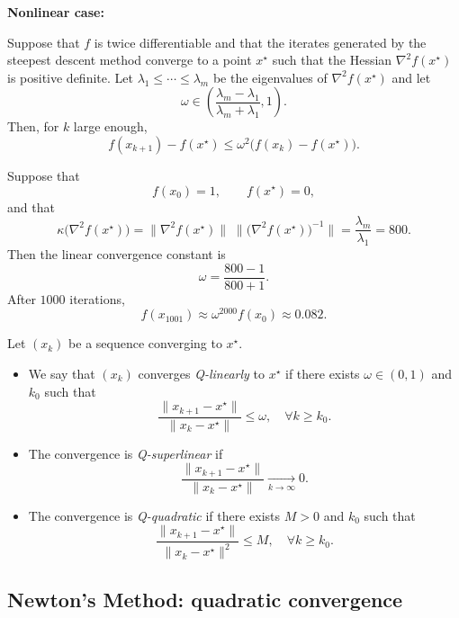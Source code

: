 \textbf{Nonlinear case:}
\begin{theoreme}
\label{thm:SD-nonlinear-rate}
Suppose that $f$ is twice differentiable and that the iterates generated by the
steepest descent method converge to a point $x^\star$ such that the Hessian
$\nabla^2 f(x^\star)$ is positive definite. Let
$\lambda_1 \le \cdots \le \lambda_m$ be the eigenvalues of $\nabla^2 f(x^\star)$
and let
\[
    \omega \in \left(\frac{\lambda_m - \lambda_1}{\lambda_m + \lambda_1}, 1\right).
\]
Then, for $k$ large enough,
\[
    f(x_{k+1}) - f(x^\star)
    \le \omega^2 \bigl( f(x_k) - f(x^\star) \bigr).
\]
\end{theoreme}

\begin{exemple}
Suppose that
\[
    f(x_0) = 1, \qquad f(x^\star) = 0,
\]
and that
\[
    \kappa\bigl(\nabla^2 f(x^\star)\bigr)
    = \|\nabla^2 f(x^\star)\|\;\bigl\|\bigl(\nabla^2 f(x^\star)\bigr)^{-1}\bigr\|
    = \frac{\lambda_m}{\lambda_1} = 800.
\]
Then the linear convergence constant is
\[
    \omega = \frac{800 - 1}{800 + 1}.
\]
After $1000$ iterations,
\[
    f(x_{1001}) \approx \omega^{2000} f(x_0) \approx 0.082.
\]
\end{exemple}

\begin{definition}
\label{def:convergence-rates}
Let $(x_k)$ be a sequence converging to $x^\star$.
\begin{itemize}
    \item We say that $(x_k)$ converges \emph{Q-linearly} to $x^\star$ if there exists
    $\omega \in (0,1)$ and $k_0$ such that
    \[
        \frac{\|x_{k+1} - x^\star\|}{\|x_k - x^\star\|}
        \le \omega, \quad \forall k \ge k_0.
    \]
    \item The convergence is \emph{Q-superlinear} if
    \[
        \frac{\|x_{k+1} - x^\star\|}{\|x_k - x^\star\|}
        \xrightarrow[k\to\infty]{} 0.
    \]
    \item The convergence is \emph{Q-quadratic} if there exists $M>0$ and $k_0$ such that
    \[
        \frac{\|x_{k+1} - x^\star\|}{\|x_k - x^\star\|^2}
        \le M,\quad \forall k \ge k_0.
    \]
\end{itemize}
\end{definition}

\subsection{Newton's Method: quadratic convergence}
\label{subsec:2.4.5}

